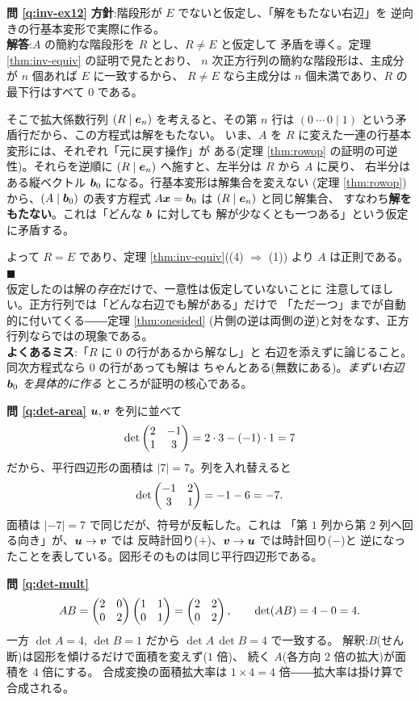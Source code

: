 \bigskip
\noindent\textbf{問 \ref{q:inv-ex12}}\quad
\textbf{方針}:階段形が $E$ でないと仮定し、「解をもたない右辺」を
逆向きの行基本変形で実際に作る。\\
\textbf{解答}:$A$ の簡約な階段形を $R$ とし、$R \neq E$ と仮定して
矛盾を導く。定理 \ref{thm:inv-equiv} の証明で見たとおり、
$n$ 次正方行列の簡約な階段形は、主成分が $n$ 個あれば $E$ に一致するから、
$R \neq E$ なら主成分は $n$ 個未満であり、$R$ の最下行はすべて $0$ である。

そこで拡大係数行列 $(R \mid \bm{e}_n)$ を考えると、その第 $n$ 行は
$(0 \ \cdots \ 0 \mid 1)$ という矛盾行だから、この方程式は解をもたない。
いま、$A$ を $R$ に変えた一連の行基本変形には、それぞれ「元に戻す操作」が
ある(定理 \ref{thm:rowop} の証明の可逆性)。それらを逆順に
$(R \mid \bm{e}_n)$ へ施すと、左半分は $R$ から $A$ に戻り、
右半分はある縦ベクトル $\bm{b}_0$ になる。行基本変形は解集合を変えない
(定理 \ref{thm:rowop})から、$(A \mid \bm{b}_0)$ の表す方程式
$A\bm{x} = \bm{b}_0$ は $(R \mid \bm{e}_n)$ と同じ解集合、
すなわち\textbf{解をもたない}。これは「どんな $\bm{b}$ に対しても
解が少なくとも一つある」という仮定に矛盾する。

よって $R = E$ であり、定理 \ref{thm:inv-equiv}((4) $\Rightarrow$ (1))
より $A$ は正則である。 $\blacksquare$\\
仮定したのは解の\emph{存在}だけで、一意性は仮定していないことに
注意してほしい。正方行列では「どんな右辺でも解がある」だけで
「ただ一つ」までが自動的に付いてくる――定理 \ref{thm:onesided}
(片側の逆は両側の逆)と対をなす、正方行列ならではの現象である。\\
\textbf{よくあるミス}:「$R$ に $0$ の行があるから解なし」と
右辺を添えずに論じること。同次方程式なら $0$ の行があっても解は
ちゃんとある(無数にある)。\emph{まずい右辺 $\bm{b}_0$ を具体的に作る}
ところが証明の核心である。

\bigskip
\noindent\textbf{問 \ref{q:det-area}}\quad
$\bm{u}, \bm{v}$ を列に並べて
\[
\det \begin{pmatrix}2 & -1 \\ 1 & 3\end{pmatrix} = 2 \cdot 3 - (-1) \cdot 1 = 7
\]
だから、平行四辺形の面積は $|7| = 7$。列を入れ替えると
\[
\det \begin{pmatrix}-1 & 2 \\ 3 & 1\end{pmatrix} = -1 - 6 = -7.
\]
面積は $|-7| = 7$ で同じだが、符号が反転した。これは
「第 $1$ 列から第 $2$ 列へ回る向き」が、$\bm{u} \to \bm{v}$ では
反時計回り($+$)、$\bm{v} \to \bm{u}$ では時計回り($-$)と
逆になったことを表している。図形そのものは同じ平行四辺形である。

\bigskip
\noindent\textbf{問 \ref{q:det-mult}}\quad
\[
AB = \begin{pmatrix}2 & 0 \\ 0 & 2\end{pmatrix}\begin{pmatrix}1 & 1 \\ 0 & 1\end{pmatrix} = \begin{pmatrix}2 & 2 \\ 0 & 2\end{pmatrix},
\qquad
\det(AB) = 4 - 0 = 4.
\]
一方 $\det A = 4$, $\det B = 1$ だから $\det A \, \det B = 4$ で一致する。
解釈:$B$(せん断)は図形を傾けるだけで面積を変えず($1$ 倍)、
続く $A$(各方向 $2$ 倍の拡大)が面積を $4$ 倍にする。
合成変換の面積拡大率は $1 \times 4 = 4$ 倍――拡大率は掛け算で合成される。

